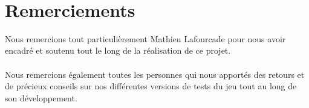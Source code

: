 \documentclass[a4paper,11pt]{article}
\begin{document}
\newcommand{\HRule}{\rule{\linewidth}{0.5mm}}



\newpage 
~
\thispagestyle{empty}

\newpage

\thispagestyle{empty}
\section*{Remerciements}

Nous remercions tout particulièrement Mathieu Lafourcade pour nous avoir encadré et soutenu tout le long de la réalisation de ce projet.
\paragraph{}
Nous remercions également toutes les personnes qui nous apportés des retours et de précieux conseils sur nos différentes versions de tests du jeu tout au long de son développement.

\newpage

\setcounter{page}{1}
\tableofcontents

\newpage

\listoffigures

\newpage 



\newpage



\newpage




\newpage



\newpage



\newpage



\newpage


\end{document}
